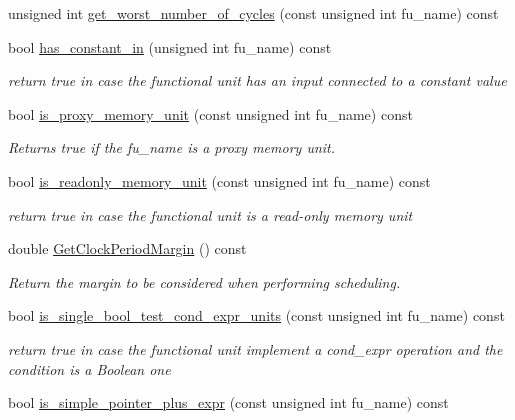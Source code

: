 \begin{DoxyCompactItemize}
unsigned int \hyperlink{classAllocationInformation_a49fdcc7141cc14a63df2ae3f35dccc7a}{get\+\_\+worst\+\_\+number\+\_\+of\+\_\+cycles} (const unsigned int fu\+\_\+name) const
\item 
bool \hyperlink{classAllocationInformation_a7ac88f38f763c08036251efa88ba041b}{has\+\_\+constant\+\_\+in} (unsigned int fu\+\_\+name) const
\begin{DoxyCompactList}\small\item\em return true in case the functional unit has an input connected to a constant value \end{DoxyCompactList}\item 
bool \hyperlink{classAllocationInformation_aaf17678cabfddb5eb558d025060a68f5}{is\+\_\+proxy\+\_\+memory\+\_\+unit} (const unsigned int fu\+\_\+name) const
\begin{DoxyCompactList}\small\item\em Returns true if the fu\+\_\+name is a proxy memory unit. \end{DoxyCompactList}\item 
bool \hyperlink{classAllocationInformation_a02860cc61e2f5514c55a2f3db8de70b3}{is\+\_\+readonly\+\_\+memory\+\_\+unit} (const unsigned int fu\+\_\+name) const
\begin{DoxyCompactList}\small\item\em return true in case the functional unit is a read-\/only memory unit \end{DoxyCompactList}\item 
double \hyperlink{classAllocationInformation_af577557336def6acf7f839f803c4ecc7}{Get\+Clock\+Period\+Margin} () const
\begin{DoxyCompactList}\small\item\em Return the margin to be considered when performing scheduling. \end{DoxyCompactList}\item 
bool \hyperlink{classAllocationInformation_a6e8cf3c7fb4095970b073e0281907e18}{is\+\_\+single\+\_\+bool\+\_\+test\+\_\+cond\+\_\+expr\+\_\+units} (const unsigned int fu\+\_\+name) const
\begin{DoxyCompactList}\small\item\em return true in case the functional unit implement a cond\+\_\+expr operation and the condition is a Boolean one \end{DoxyCompactList}\item 
bool \hyperlink{classAllocationInformation_a9cb53d3aaad49e972193e98b8ab81e0a}{is\+\_\+simple\+\_\+pointer\+\_\+plus\+\_\+expr} (const unsigned int fu\+\_\+name) const

\end{DoxyCompactItemize}
